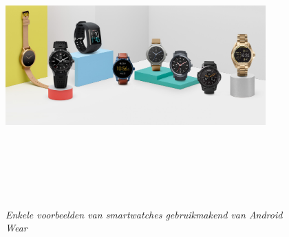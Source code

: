 \begin{figure}[H]
	\centering
	\caption{\textit{Enkele voorbeelden van smartwatches gebruikmakend van Android Wear}}
	\includegraphics[width=10cm, height=10cm, keepaspectratio]{img/WearExamples}\\[.5cm]
\end{figure}
